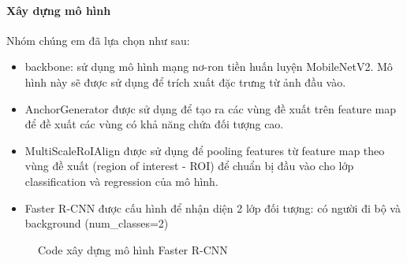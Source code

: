\paragraph{Xây dựng mô hình\\}
Nhóm chúng em đã lựa chọn như sau:
\begin{itemize}[noitemsep, topsep=0pt, leftmargin=1.25em, label={$-$}]
    \item backbone: sử dụng mô hình mạng nơ-ron tiền huấn luyện MobileNetV2. Mô hình này sẽ được sử dụng để trích xuất đặc trưng từ ảnh đầu vào.
    \item AnchorGenerator được sử dụng để tạo ra các vùng đề xuất trên feature map để đề xuất các vùng có khả năng chứa đối tượng cao.
    \item MultiScaleRoIAlign được sử dụng để pooling features từ feature map theo vùng đề xuất (region of interest - ROI) để chuẩn bị đầu vào cho lớp classification và regression của mô hình.
    \item Faster R-CNN được cấu hình để nhận diện 2 lớp đối tượng: có người đi bộ và background (num\_classes=2)
\end{itemize}

\pagebreak

\begin{figure}[h!]
  \centering
  \qquad
  \caption{Code xây dựng mô hình Faster R-CNN}
\end{figure}

